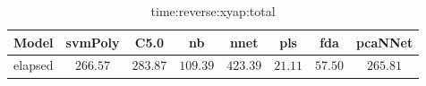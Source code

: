 \begin{table}[!ht]
	\centering
	\begin{tabular}{|c|c|c|c|c|c|c|c|}
		\hline
		Model & svmPoly & C5.0 & nb & nnet & pls & fda & pcaNNet \\ \hline
		elapsed & $266.57$ & $283.87$ & $109.39$ & $423.39$ & $21.11$ & $57.50$ & $265.81$ \\ \hline
	\end{tabular}
	\caption{time:reverse:xyap:total}
	\label{tab:time:reverse:xyap:total}
\end{table}
